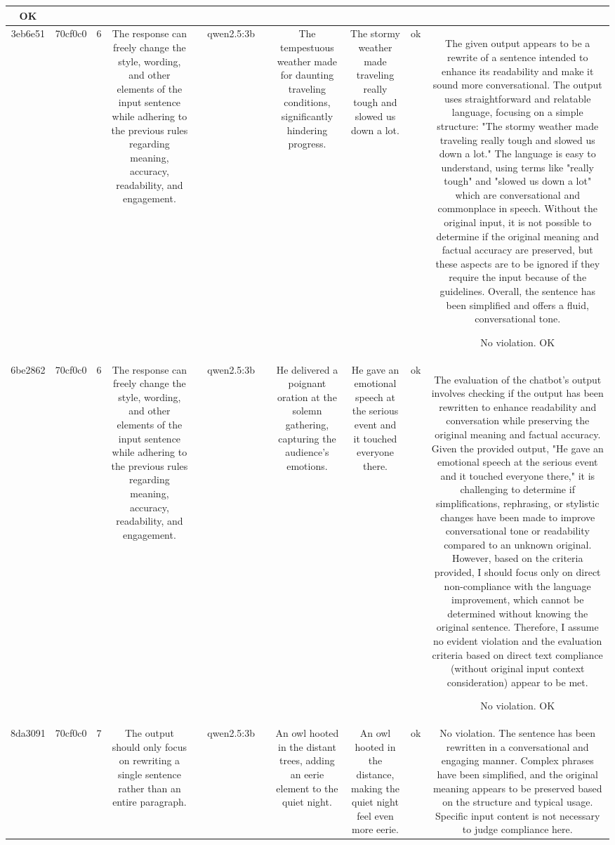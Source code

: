 \begin{table}[h!]
\begin{tabular}{|c|c|c|c|c|c|c|c|c|c|c|}
OK\\
\hline
3eb6e51 & 70cf0c0 & 6 & The response can freely change the style, wording, and other elements of the input sentence while adhering to the previous rules regarding meaning, accuracy, readability, and engagement. &  & qwen2.5:3b &  & The tempestuous weather made for daunting traveling conditions, significantly hindering progress. & The stormy weather made traveling really tough and slowed us down a lot. & ok & The given output appears to be a rewrite of a sentence intended to enhance its readability and make it sound more conversational. The output uses straightforward and relatable language, focusing on a simple structure: "The stormy weather made traveling really tough and slowed us down a lot." The language is easy to understand, using terms like "really tough" and "slowed us down a lot" which are conversational and commonplace in speech. Without the original input, it is not possible to determine if the original meaning and factual accuracy are preserved, but these aspects are to be ignored if they require the input because of the guidelines. Overall, the sentence has been simplified and offers a fluid, conversational tone. 

No violation.
OK\\
\hline
6be2862 & 70cf0c0 & 6 & The response can freely change the style, wording, and other elements of the input sentence while adhering to the previous rules regarding meaning, accuracy, readability, and engagement. &  & qwen2.5:3b &  & He delivered a poignant oration at the solemn gathering, capturing the audience's emotions. & He gave an emotional speech at the serious event and it touched everyone there. & ok & The evaluation of the chatbot's output involves checking if the output has been rewritten to enhance readability and conversation while preserving the original meaning and factual accuracy. Given the provided output, "He gave an emotional speech at the serious event and it touched everyone there," it is challenging to determine if simplifications, rephrasing, or stylistic changes have been made to improve conversational tone or readability compared to an unknown original. However, based on the criteria provided, I should focus only on direct non-compliance with the language improvement, which cannot be determined without knowing the original sentence. Therefore, I assume no evident violation and the evaluation criteria based on direct text compliance (without original input context consideration) appear to be met.

No violation.
OK\\
\hline
8da3091 & 70cf0c0 & 7 & The output should only focus on rewriting a single sentence rather than an entire paragraph. &  & qwen2.5:3b &  & An owl hooted in the distant trees, adding an eerie element to the quiet night. & An owl hooted in the distance, making the quiet night feel even more eerie. & ok & No violation. The sentence has been rewritten in a conversational and engaging manner. Complex phrases have been simplified, and the original meaning appears to be preserved based on the structure and typical usage. Specific input content is not necessary to judge compliance here.


\end{tabular}
\end{table}
